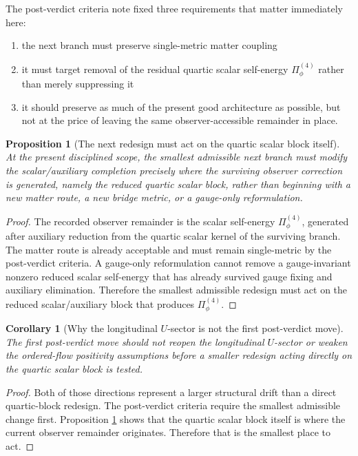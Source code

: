 \documentclass[11pt]{article}
\newtheorem{proposition}{Proposition}
\newtheorem{corollary}{Corollary}
\begin{document}
The post-verdict criteria note fixed three requirements that matter immediately here:
\begin{enumerate}
    \item the next branch must preserve single-metric matter coupling
    \item it must target removal of the residual quartic scalar self-energy \(\Pi_\phi^{(4)}\) rather than merely suppressing it
    \item it should preserve as much of the present good architecture as possible, but not at the price of leaving the same observer-accessible remainder in place.
\end{enumerate}

\begin{proposition}[The next redesign must act on the quartic scalar block itself]
\label{prop:actonquartic}
At the present disciplined scope, the smallest admissible next branch must modify the scalar/auxiliary completion precisely where the surviving observer correction is generated, namely the reduced quartic scalar block, rather than beginning with a new matter route, a new bridge metric, or a gauge-only reformulation.
\end{proposition}

\begin{proof}
The recorded observer remainder is the scalar self-energy \(\Pi_\phi^{(4)}\), generated after auxiliary reduction from the quartic scalar kernel of the surviving branch. The matter route is already acceptable and must remain single-metric by the post-verdict criteria. A gauge-only reformulation cannot remove a gauge-invariant nonzero reduced scalar self-energy that has already survived gauge fixing and auxiliary elimination. Therefore the smallest admissible redesign must act on the reduced scalar/auxiliary block that produces \(\Pi_\phi^{(4)}\).
\end{proof}

\begin{corollary}[Why the longitudinal \texorpdfstring{\(U\)}{U}-sector is not the first post-verdict move]
\label{cor:notU}
The first post-verdict move should not reopen the longitudinal \(U\)-sector or weaken the ordered-flow positivity assumptions before a smaller redesign acting directly on the quartic scalar block is tested.
\end{corollary}

\begin{proof}
Both of those directions represent a larger structural drift than a direct quartic-block redesign. The post-verdict criteria require the smallest admissible change first. Proposition \ref{prop:actonquartic} shows that the quartic scalar block itself is where the current observer remainder originates. Therefore that is the smallest place to act.
\end{proof}
\end{document}
